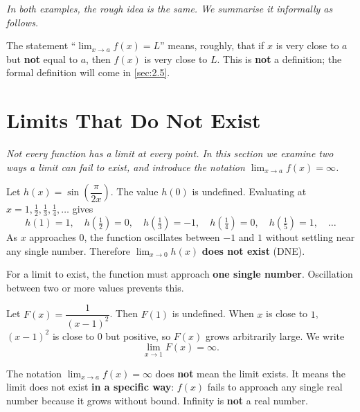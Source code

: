 \textit{In both examples, the rough idea is the same.  We summarise it informally as follows.}

\begin{remark}
The statement ``$\lim_{x \to a} f(x) = L$'' means, roughly, that if $x$ is very close to $a$ but \textbf{not} equal to $a$, then $f(x)$ is very close to $L$.  This is \textbf{not} a definition; the formal definition will come in \cref{sec:2.5}.
\end{remark}

\section{Limits That Do Not Exist}
\label{sec:2.2}

\textit{Not every function has a limit at every point.  In this section we examine two ways a limit can fail to exist, and introduce the notation $\lim_{x \to a} f(x) = \infty$.}

\begin{example}
\label{ex:2-3}
Let $h(x) = \sin\!\left(\dfrac{\pi}{2x}\right)$.  The value $h(0)$ is undefined.  Evaluating at $x = 1, \frac{1}{2}, \frac{1}{3}, \frac{1}{4}, \ldots$ gives
\[
  h(1) = 1,\quad h\!\left(\tfrac{1}{2}\right) = 0,\quad h\!\left(\tfrac{1}{3}\right) = -1,\quad h\!\left(\tfrac{1}{4}\right) = 0,\quad h\!\left(\tfrac{1}{5}\right) = 1,\quad \ldots
\]
As $x$ approaches $0$, the function oscillates between $-1$ and $1$ without settling near any single number.  Therefore $\lim_{x \to 0} h(x)$ \textbf{does not exist} (DNE).
\end{example}

\begin{remark}
For a limit to exist, the function must approach \textbf{one single number}.  Oscillation between two or more values prevents this.
\end{remark}

\begin{example}
\label{ex:2-4}
Let $F(x) = \dfrac{1}{(x-1)^{2}}$.  Then $F(1)$ is undefined.  When $x$ is close to $1$, $(x-1)^{2}$ is close to $0$ but positive, so $F(x)$ grows arbitrarily large.  We write
\[
  \lim_{x \to 1} F(x) = \infty.
\]
\end{example}

\begin{remark}[Warning]
The notation $\lim_{x \to a} f(x) = \infty$ does \textbf{not} mean the limit exists.  It means the limit does not exist \textbf{in a specific way}: $f(x)$ fails to approach any single real number because it grows without bound.  Infinity is \textbf{not} a real number.
\end{remark}

